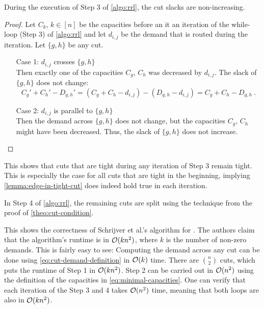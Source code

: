 \begin{lemma}
	\label{lemma:tight-cuts-remain-tight}
	During the execution of Step 3 of \cref{algo:rrl}, the cut slacks are non-increasing.
\end{lemma}
\begin{proof}
	Let $C_k$, $k \in [n]$ be the capacities before an it an iteration of the while-loop (Step 3) of \cref{algo:rrl} and let $d_{i, j}$ be the demand that is routed during the iteration.
	Let $\{g, h\}$ be any cut.
	
	\begin{enumerate}[align=left]
		\item[Case 1: $d_{i, j}$ crosses $\{g, h\}$]{\mbox{}\\
			Then exactly one of the capacities $C_g$, $C_h$ was decreased by $d_{i, j}$.
			The slack of $\{g, h\}$ does not change:
			\begin{equation}
				C_g' + C_h' - D_{g, h}' = (C_g + C_h - d_{i, j}) - (D_{g, h} - d_{i, j}) = C_g + C_h - D_{g, h} \ .
			\end{equation}
		}
		\item[Case 2: $d_{i, j}$ is parallel to $\{g, h\}$]{\mbox{}\\
			Then the demand across $\{g, h\}$ does not change, but the capacities $C_g$, $C_h$ might have been decreased.
			Thus, the slack of $\{g, h\}$ does not increase.
		}
	\end{enumerate}
\end{proof}

This shows that cuts that are tight during any iteration of Step 3 remain tight.
This is especially the case for all cuts that are tight in the beginning, implying \cref{lemma:edge-in-tight-cut} does indeed hold true in each iteration.

In Step 4 of \cref{algo:rrl}, the remaining cuts are split using the technique from the proof of \cref{theo:cut-condition}.

This shows the correctness of Schrijver et al.'s \cite{schrijver99} algorithm for \RRL.
The authors claim that the algorithm's runtime is in $\mathcal{O}(k n^2)$, where $k$ is the number of non-zero demands.
This is fairly easy to see:
Computing the demand across any cut can be done using \cref{eq:cut-demand-definition} in $\mathcal{O}(k)$ time.
There are $\binom{n}{2}$ cuts, which puts the runtime of Step 1 in $\mathcal{O}(k n^2)$.
Step 2 can be carried out in $\mathcal{O}(n^2)$ using the definition of the capacities in \cref{eq:minimal-capacities}.
One can verify that each iteration of the Step 3 and 4 takes $\mathcal{O}(n^2)$ time, meaning that both loops are also in $\mathcal{O}(k n^2)$.

